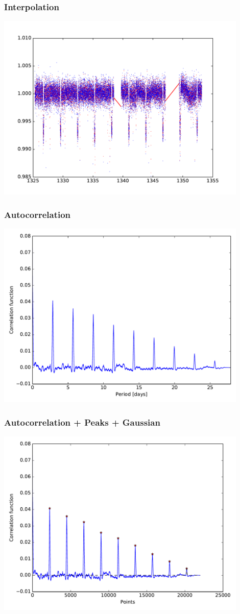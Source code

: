 \documentclass[notes]{beamer}
\begin{document}
\begin{frame}
\frametitle{Interpolation}
\centering
\includegraphics[width=0.9\textwidth]{../figures/2018-11-14_15:35:52_inter_curve0.pdf}
\end{frame}

\begin{frame}
\frametitle{Autocorrelation}
\centering
\includegraphics[width=0.9\textwidth]{../figures/2018-11-19_14:46:56_correlation_fig0.pdf}
\end{frame}

\begin{frame}
\frametitle{Autocorrelation + Peaks + Gaussian}
\centering
\includegraphics[width=0.9\textwidth]{../figures/2018-11-20_11:12:6_peaks_fig0.pdf}
\end{frame}
\end{document}
